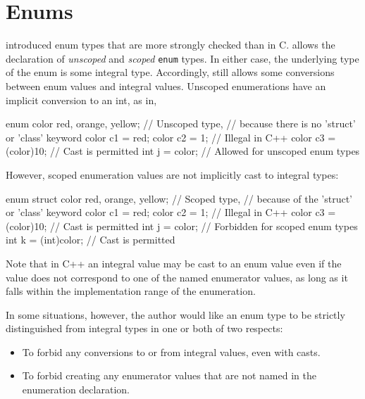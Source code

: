 \section{Enums}
\label{sec:enums}


\lang{} introduced enum types that are more strongly checked than in C. \lang{} allows the declaration of \textit{unscoped} and \textit{scoped} \lstinline|enum| types. In either case, the underlying type of the enum is some integral type. Accordingly, \lang{} still allows some conversions between enum values and integral values. Unscoped enumerations have an implicit conversion to an int, as in,

\begin{listing-nonumber}
enum color { red, orange, yellow}; // Unscoped type, 
                        // because there is no 'struct' or 'class' keyword
color c1 = red;
color c2 = 1; // Illegal in C++
color c3 = (color)10; // Cast is permitted
int j = color; // Allowed for unscoped enum types
\end{listing-nonumber}

However, scoped enumeration values are not implicitly cast to integral types:

\begin{listing-nonumber}
enum struct color { red, orange, yellow}; // Scoped type, 
                        // because of the 'struct' or 'class' keyword
color c1 = red;
color c2 = 1; // Illegal in C++
color c3 = (color)10; // Cast is permitted
int j = color; // Forbidden for scoped enum types
int k = (int)color; // Cast is permitted
\end{listing-nonumber}

Note that in C++ an integral value may be cast to an enum value even if the value does not correspond to one of the named
enumerator values, as long as it falls within the implementation range of the enumeration.

In some situations, however, the author would like an enum type to be strictly distinguished from integral types in one or both of two respects:
\begin{itemize}
\item To forbid any conversions to or from integral values, even with casts.
\item To forbid creating any enumerator values that are not named in the enumeration declaration.
\end{itemize}

